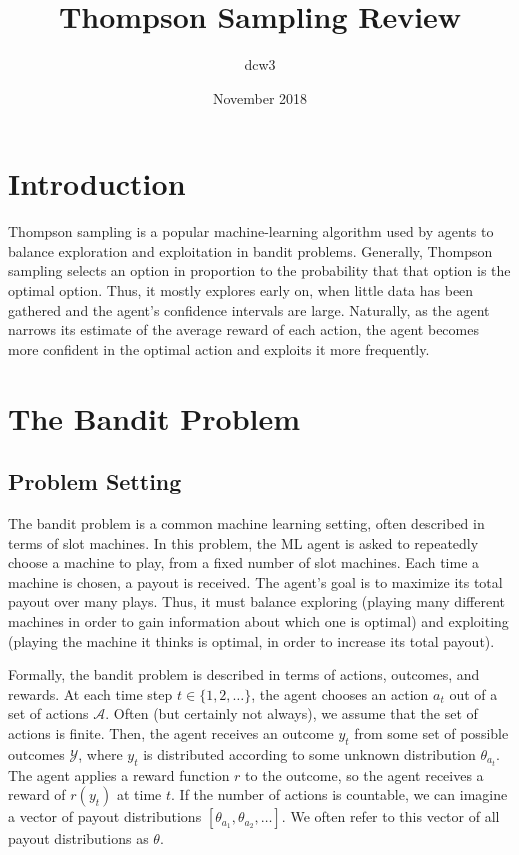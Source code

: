 \documentclass{article}
\title{Thompson Sampling Review}
\author{dcw3}
\date{November 2018}
\begin{document}
\maketitle

\section{Introduction}
Thompson sampling is a popular machine-learning algorithm used by agents to balance exploration and exploitation in bandit problems. Generally, Thompson sampling selects an option in proportion to the probability that that option is the optimal option. Thus, it mostly explores early on, when little data has been gathered and the agent's confidence intervals are large. Naturally, as the agent narrows its estimate of the average reward of each action, the agent becomes more confident in the optimal action and exploits it more frequently.

\section{The Bandit Problem}

\subsection{Problem Setting}

The bandit problem is a common machine learning setting, often described in terms of slot machines. In this problem, the ML agent is asked to repeatedly choose a machine to play, from a fixed number of slot machines. Each time a machine is chosen, a payout is received. The agent's goal is to maximize its total payout over many plays. Thus, it must balance exploring (playing many different machines in order to gain information about which one is optimal) and exploiting (playing the machine it thinks is optimal, in order to increase its total payout).

Formally, the bandit problem is described in terms of actions, outcomes, and rewards. At each time step $t\in\{1, 2, \ldots\}$, the agent chooses an action $a_t$ out of a set of actions $\mathcal{A}$. Often (but certainly not always), we assume that the set of actions is finite. Then, the agent receives an outcome $y_t$ from some set of possible outcomes $\mathcal{Y}$, where $y_t$ is distributed according to some unknown distribution $\theta_{a_t}$. The agent applies a reward function $r$ to the outcome, so the agent receives a reward of $r(y_t)$ at time $t$.  If the number of actions is countable, we can imagine a vector of payout distributions $[\theta_{a_1}, \theta_{a_2},\ldots]$. We often refer to this vector of all payout distributions as $\theta$.
\end{document}

